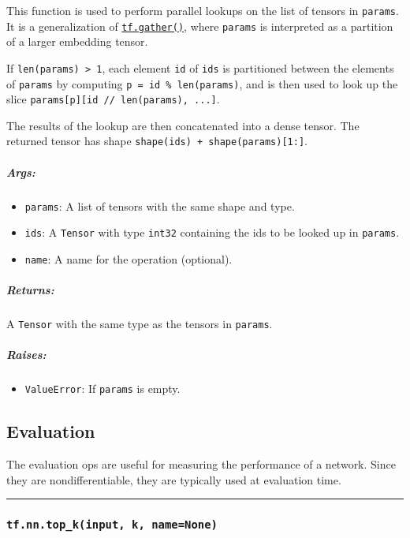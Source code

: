 This function is used to perform parallel lookups on the list of tensors
in \texttt{params}. It is a generalization of
\href{../../api_docs/python/array_ops.md\#gather}{\texttt{tf.gather()}},
where \texttt{params} is interpreted as a partition of a larger
embedding tensor.

If \texttt{len(params)\ \textgreater{}\ 1}, each element \texttt{id} of
\texttt{ids} is partitioned between the elements of \texttt{params} by
computing \texttt{p\ =\ id\ \%\ len(params)}, and is then used to look
up the slice \texttt{params{[}p{]}{[}id\ //\ len(params),\ ...{]}}.

The results of the lookup are then concatenated into a dense tensor. The
returned tensor has shape \texttt{shape(ids)\ +\ shape(params){[}1:{]}}.

\subparagraph{Args: }\label{args-20}

\begin{itemize}
\tightlist
\item
  \texttt{params}: A list of tensors with the same shape and type.
\item
  \texttt{ids}: A \texttt{Tensor} with type \texttt{int32} containing
  the ids to be looked up in \texttt{params}.
\item
  \texttt{name}: A name for the operation (optional).
\end{itemize}

\subparagraph{Returns: }\label{returns-20}

A \texttt{Tensor} with the same type as the tensors in \texttt{params}.

\subparagraph{Raises: }\label{raises-1}

\begin{itemize}
\tightlist
\item
  \texttt{ValueError}: If \texttt{params} is empty.
\end{itemize}

\subsection{Evaluation }\label{evaluation}

The evaluation ops are useful for measuring the performance of a
network. Since they are nondifferentiable, they are typically used at
evaluation time.

\begin{center}\rule{0.5\linewidth}{\linethickness}\end{center}

\subsubsection{\texorpdfstring{\texttt{tf.nn.top\_k(input,\ k,\ name=None)}
}{tf.nn.top\_k(input, k, name=None) }}\label{tf.nn.topux5fkinput-k-namenone}

